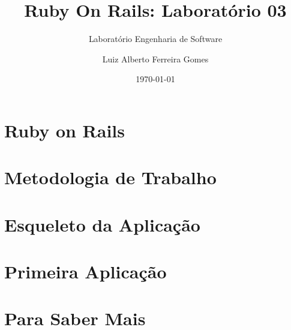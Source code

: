 \documentclass[t, 				             
			   final,
			   12pt, 				         
			   xcolor={usenames,dvipsnames}, 
			   table]{beamer}
\begin{document}
    \author{Luiz Alberto Ferreira Gomes}
    \title{Ruby On Rails: Laboratório 03}
    \subtitle{Laboratório Engenharia de Software}
    \date{\today}

	
	  	
    
    \section{Ruby on Rails}
	
    
    \section{Metodologia de Trabalho}
    

    \section{Esqueleto da Aplicação}
    
   
    \section{Primeira Aplicação}
    
    
    
    
    
    
    
    
    \section{Para Saber Mais}
	
\end{document}
